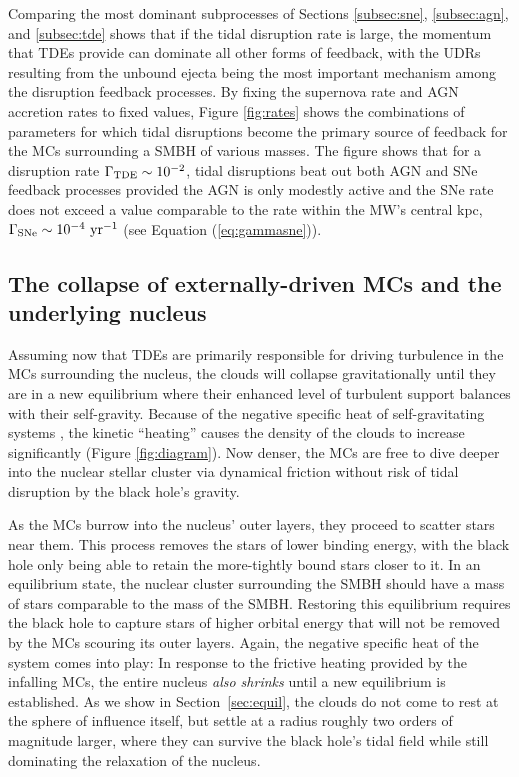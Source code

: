 \documentclass[preprint2]{aastex}
\begin{document}
Comparing the most dominant subprocesses of Sections \ref{subsec:sne}, \ref{subsec:agn}, and \ref{subsec:tde} shows that if the tidal disruption rate is large, the momentum that TDEs provide can dominate all other forms of feedback, with the UDRs resulting from the unbound ejecta being the most important mechanism among the disruption feedback processes. By fixing the supernova rate and AGN accretion rates to fixed values, Figure \ref{fig:rates} shows the combinations of parameters for which tidal disruptions become the primary source of feedback for the MCs surrounding a SMBH of various masses. The figure shows that for a disruption rate $\Gamma_{\rm TDE} \sim 10^{-2}$, tidal disruptions beat out both AGN and SNe feedback processes provided the AGN is only modestly active and the SNe rate does not exceed a value comparable to the rate within the MW's central kpc, $\Gamma_{\rm SNe} \sim 10^{-4}~{\rm yr}^{-1}$ (see Equation (\ref{eq:gammasne})).

\subsection{The collapse of externally-driven MCs and the underlying nucleus}

Assuming now that TDEs are primarily responsible for driving turbulence in the MCs surrounding the nucleus, the clouds will collapse gravitationally until they are in a new equilibrium where their enhanced level of turbulent support balances with their self-gravity. Because of the negative specific heat of self-gravitating systems \citep{Lynden-Bell:1968a}, the kinetic ``heating'' causes the density of the clouds to increase significantly (Figure \ref{fig:diagram}). Now denser, the MCs are free to dive deeper into the nuclear stellar cluster via dynamical friction without risk of tidal disruption by the black hole's gravity.

As the MCs burrow into the nucleus' outer layers, they proceed to scatter stars near them. This process removes the stars of lower binding energy, with the black hole only being able to retain the more-tightly bound stars closer to it. In an equilibrium state, the nuclear cluster surrounding the SMBH should have a mass of stars comparable to the mass of the SMBH. Restoring this equilibrium requires the black hole to capture stars of higher orbital energy that will not be removed by the MCs scouring its outer layers. Again, the negative specific heat of the system comes into play: In response to the frictive heating provided by the infalling MCs, the entire nucleus {\it also shrinks} until a new equilibrium is established. As we show in Section~\ref{sec:equil}, the clouds do not come to rest at the sphere of influence itself, but settle at a radius roughly two orders of magnitude larger, where they can survive the black hole's tidal field while still dominating the relaxation of the nucleus.
\end{document}
